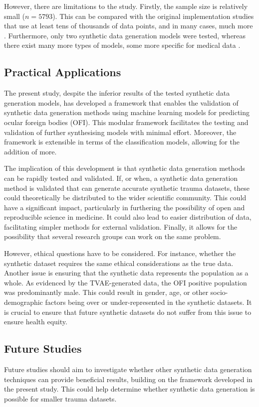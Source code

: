 \documentclass[12pt, a4paper]{article}
\begin{document}
However, there are limitations to the study. Firstly, the sample size is relatively small ($n = 5793$). This can be compared with the original implementation studies that use at least tens of thousands of data points, and in many cases, much more \cite{xu_modeling_2019,karras_training_2020}. Furthermore, only two synthetic data generation models were tested, whereas there exist many more types of models, some more specific for medical data \cite{hernandez_synthetic_2022}.

\subsection{Practical Applications}
The present study, despite the inferior results of the tested synthetic data generation models, has developed a framework that enables the validation of synthetic data generation methods using machine learning models for predicting ocular foreign bodies (OFI). This modular framework facilitates the testing and validation of further synthesising models with minimal effort. Moreover, the framework is extensible in terms of the classification models, allowing for the addition of more.

The implication of this development is that synthetic data generation methods can be rapidly tested and validated. If, or when, a synthetic data generation method is validated that can generate accurate synthetic trauma datasets, these could theoretically be distributed to the wider scientific community. This could have a significant impact, particularly in furthering the possibility of open and reproducible science in medicine. It could also lead to easier distribution of data, facilitating simpler methods for external validation. Finally, it allows for the possibility that several research groups can work on the same problem.

However, ethical questions have to be considered. For instance, whether the synthetic dataset requires the same ethical considerations as the true data. Another issue is ensuring that the synthetic data represents the population as a whole. As evidenced by the TVAE-generated data, the OFI positive population was predominantly male. This could result in gender, age, or other socio-demographic factors being over or under-represented in the synthetic datasets. It is crucial to ensure that future synthetic datasets do not suffer from this issue to ensure health equity.

\subsection{Future Studies}
Future studies should aim to investigate whether other synthetic data generation techniques can provide beneficial results, building on the framework developed in the present study. This could help determine whether synthetic data generation is possible for smaller trauma datasets.
\end{document}
